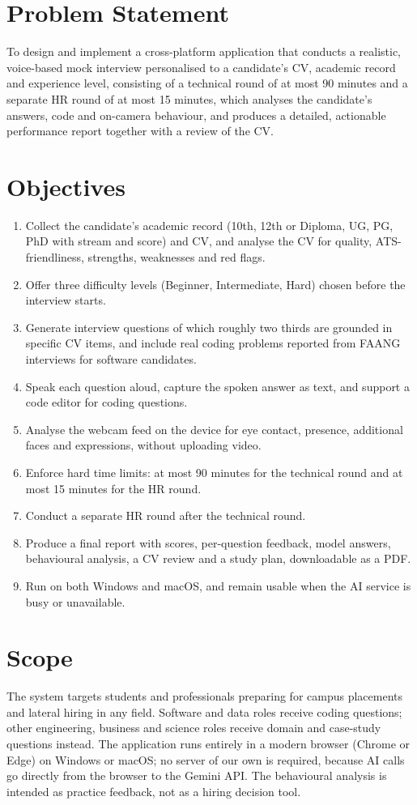 \documentclass[12pt,a4paper,oneside]{report}
\begin{document}
\section{Problem Statement}
To design and implement a cross-platform application that conducts a realistic, voice-based mock interview personalised to a candidate's CV, academic record and experience level, consisting of a technical round of at most 90 minutes and a separate HR round of at most 15 minutes, which analyses the candidate's answers, code and on-camera behaviour, and produces a detailed, actionable performance report together with a review of the CV.

\section{Objectives}
\begin{enumerate}
  \item Collect the candidate's academic record (10th, 12th or Diploma, UG, PG, PhD with stream and score) and CV, and analyse the CV for quality, ATS-friendliness, strengths, weaknesses and red flags.
  \item Offer three difficulty levels (Beginner, Intermediate, Hard) chosen before the interview starts.
  \item Generate interview questions of which roughly two thirds are grounded in specific CV items, and include real coding problems reported from FAANG interviews for software candidates.
  \item Speak each question aloud, capture the spoken answer as text, and support a code editor for coding questions.
  \item Analyse the webcam feed on the device for eye contact, presence, additional faces and expressions, without uploading video.
  \item Enforce hard time limits: at most 90 minutes for the technical round and at most 15 minutes for the HR round.
  \item Conduct a separate HR round after the technical round.
  \item Produce a final report with scores, per-question feedback, model answers, behavioural analysis, a CV review and a study plan, downloadable as a PDF.
  \item Run on both Windows and macOS, and remain usable when the AI service is busy or unavailable.
\end{enumerate}

\section{Scope}
The system targets students and professionals preparing for campus placements and lateral hiring in any field. Software and data roles receive coding questions; other engineering, business and science roles receive domain and case-study questions instead. The application runs entirely in a modern browser (Chrome or Edge) on Windows or macOS; no server of our own is required, because AI calls go directly from the browser to the Gemini API. The behavioural analysis is intended as practice feedback, not as a hiring decision tool.
\end{document}
